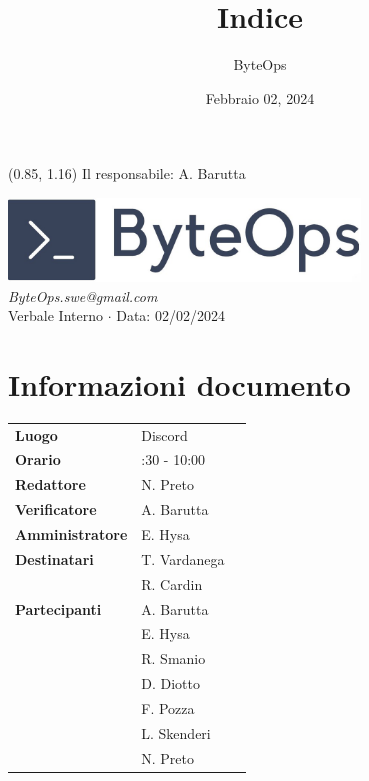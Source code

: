 \documentclass{article}
\title{\textbf{\fontsize{28}{6}\selectfont Indice}}
\author{\fontsize{14}{6}\selectfont ByteOps}
\date{Febbraio 02, 2024}
\begin{document}
\begin{textblock*}{\textwidth}(0.85\textwidth, 1.16\textheight)
    Il responsabile: A. Barutta
\end{textblock*}

\pagestyle{fancy}
\begin{center}
\includegraphics[width = 0.7\textwidth]{../../../Images/logo.png} \\
\vspace{0.2cm}
\textcolor[RGB]{60, 60, 60}{\textit{ByteOps.swe@gmail.com}} \\
\vspace{1cm}
\fontsize{16}{6}\selectfont Verbale Interno $\cdot$ Data: 02/02/2024 \\
\vspace{0.5cm}
\end{center}

\section*{Informazioni documento}
\def\arraystretch{1.2}
\begin{tabular}{>{\raggedleft\arraybackslash}p{}|>{\raggedright\arraybackslash}p{}c}
    \hline
    \addlinespace
    \textbf{Luogo} & Discord \vspace{10pt} \\
    \textbf{Orario} & 9:30 - 10:00 \vspace{10pt} \\
    \textbf{Redattore} & N. Preto \vspace{10pt} \\
    \textbf{Verificatore} & A. Barutta \vspace{10pt} \\
    \textbf{Amministratore} & E. Hysa \vspace{10pt} \\
    \textbf{Destinatari} & T. Vardanega \\ & R. Cardin \vspace{10pt} \\
    \textbf{Partecipanti} & A. Barutta \\ & E. Hysa \\ & R. Smanio \\ & D. Diotto \\ & F. Pozza \\ & L. Skenderi \\ & N. Preto \vspace{10pt} \\
\end{tabular}
\pagebreak 
\end{document}
